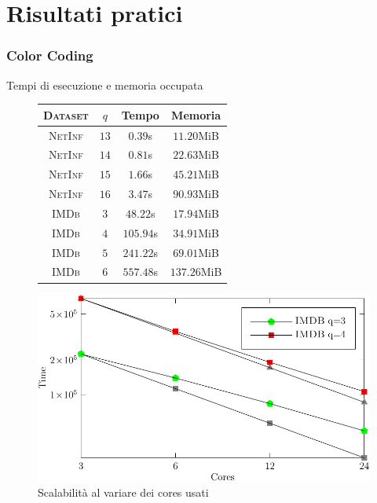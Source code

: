 \section{Risultati pratici}

\begin{frame}
	\Large
	\sectionpage
	\centering
\end{frame}

\begin{frame}
	\frametitle{Color Coding}
	\centering
	\Large
	Tempi di esecuzione e memoria occupata
	
	\small
	\begin{figure}[h]
		\centering
		\begin{minipage}[ht]{.49\textwidth}
			\centering
			\begin{table}
				\centering
				\begin{tabular}{|c|c|c|c|}
					\hline
					\textsc{Dataset} & $q$  &               Tempo & Memoria \\ \hline \hline
					\textsc{NetInf}  & $13$ & \phantom{11}$0.39$s & \phantom{1}$11.20$MiB     \\ \hline
					\textsc{NetInf}  & $14$ & \phantom{11}$0.81$s & \phantom{1}$22.63$MiB     \\ \hline
					\textsc{NetInf}  & $15$ & \phantom{11}$1.66$s & \phantom{1}$45.21$MiB     \\ \hline
					\textsc{NetInf}  & $16$ & \phantom{11}$3.47$s & \phantom{1}$90.93$MiB     \\ \hline \hline
					\textsc{IMDb}    & $3$  & \phantom{1}$48.22$s & \phantom{1}$17.94$MiB     \\ \hline
					\textsc{IMDb}    & $4$  &           $105.94$s & \phantom{1}$34.91$MiB     \\ \hline
					\textsc{IMDb}    & $5$  &           $241.22$s & \phantom{1}$69.01$MiB     \\ \hline
					\textsc{IMDb}    & $6$  &           $557.48$s & $137.26$MiB     \\ \hline
				\end{tabular}
			\end{table}
		\end{minipage}
		\begin{minipage}[ht]{.49\textwidth}
			\centering
			\includegraphics[width=.9\textwidth]{images/3_color_coding}
			\caption{Scalabilità al variare dei cores usati}
		\end{minipage}
	\end{figure}
	

\end{frame}
